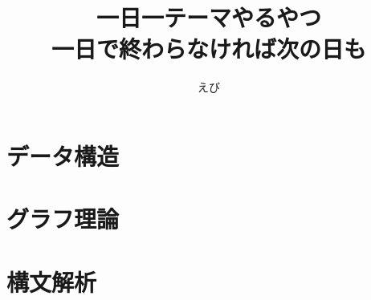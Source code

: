 \documentclass[a4paper]{jsarticle}
\title{
  {\Huge 一日一テーマやるやつ}\\
  {\Large 一日で終わらなければ次の日も}
}
\author{
  えび
}
\begin{document}
\maketitle

\newpage
\tableofcontents

\newpage
{}
\setcounter{section}{0}
\renewcommand{\thesection}{\arabic{section}}

\section{データ構造}








\newpage
\section{グラフ理論}


\newpage
\section{構文解析}




\end{document}
